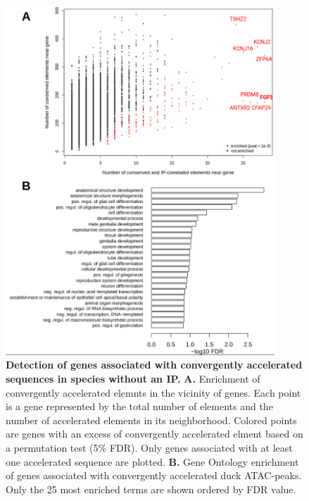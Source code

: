 \begin{figure}[hbt!]
 \centering
 \includegraphics[width=0.9\textwidth, page=1] {figures/IPLOSS/test.png}
 \caption[Detection of genes associated with convergently accelerated sequences in species without an IP.]{
 \textbf{Detection of genes associated with convergently accelerated sequences in species without an IP.}
 \textbf{A.} Enrichment of convergently accelerated elemnts in the vicinity of genes. Each point is a gene represented by the total number of elements and the number of accelerated elements in its neighborhood. Colored points are genes with an excess of convergently accelerated elment based on a permutation test (5\% FDR). Only genes associated with at least one accelerated sequence are plotted. 
 \textbf{B.} Gene Ontology enrichment of genes associated with convergently accelerated duck ATAC-peaks. Only the 25 most enriched terms are shown ordered by FDR value.
 \\
 }
 \label{fig:IPLOSS-fig6}
\end{figure} 

